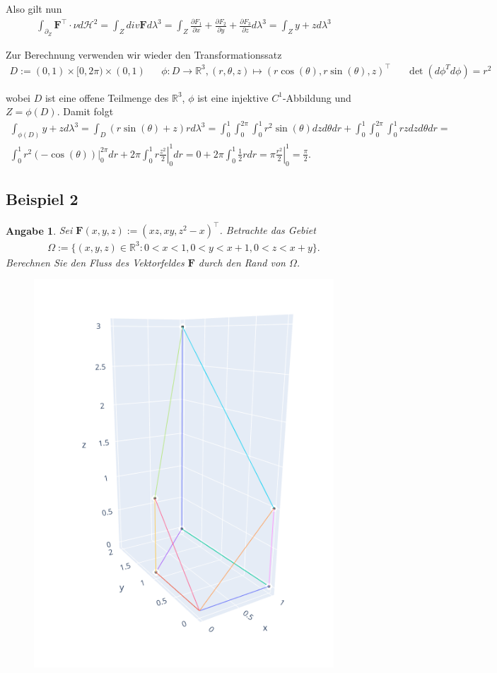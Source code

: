 \documentclass[]{article}
\newtheorem*{angabe*}{Angabe}
\begin{document}
\begin{enumerate}[label=(\roman*)]
	Also gilt nun
	\begin{align*}
		\int_{\partial_Z} \bm{F}^\top \cdot \nu d\mathcal{H}^2 = \int_Z div\bm{F} d\lambda^3 = \int_Z \frac{\partial F_1}{\partial x} + \frac{\partial F_2}{\partial y} + \frac{\partial F_3}{\partial z} d\lambda^3 = \int_Z y + z d\lambda^3
	\end{align*}

	Zur Berechnung verwenden wir wieder den Transformationssatz
	\begin{align*}
		D := (0,1)\times[0,2\pi)\times(0,1) && \phi:D\rightarrow\mathbb{R}^3, (r,\theta,z) \mapsto (r\cos(\theta), r\sin(\theta), z)^\top && \det(d\phi^T d\phi) = r^2
	\end{align*}

	wobei $D$ ist eine offene Teilmenge des $\mathbb{R}^3$, $\phi$ ist eine injektive $C^1$-Abbildung und $Z=\phi(D)$. Damit folgt 
	\begin{align*}
		\int_{\phi(D)} y + z d\lambda^3 = \int_D (r\sin(\theta) + z)r d\lambda^3 = \int_{0}^{1} \int_{0}^{2\pi} \int_{0}^{1} r^2 \sin(\theta) dz d\theta dr + \int_{0}^{1} \int_{0}^{2\pi} \int_{0}^{1} rz dz d\theta dr = \\
		\int_{0}^{1} r^2 \left.(-\cos(\theta))\right\vert_0^{2\pi} dr + 2\pi \int_{0}^{1} r \left. \frac{z^2}{2}\right\vert_0^1 dr = 0 + 2\pi \int_0^1 \frac{1}{2} r dr = \pi \left. \frac{r^2}{2}\right\vert_0^1 = \frac{\pi}{2}.
	\end{align*}

\end{enumerate}
\newpage

\subsection*{Beispiel 2}
\begin{angabe*}
	Sei $\bm{F}(x,y,z):=(xz, xy, z^2-x)^\top$. Betrachte das Gebiet
	\begin{align*}
		\Omega := \{(x,y,z)\in \mathbb{R}^3: 0<x<1, 0<y<x+1, 0<z<x+y\}.
	\end{align*}
	Berechnen Sie den Fluss des Vektorfeldes $\bm{F}$ durch den Rand von $\Omega$.
\end{angabe*}

\begin{figure}[h!]
	\center
	\includegraphics[width=0.5\columnwidth]{bsp_2.png}
\end{figure}
\end{document}
